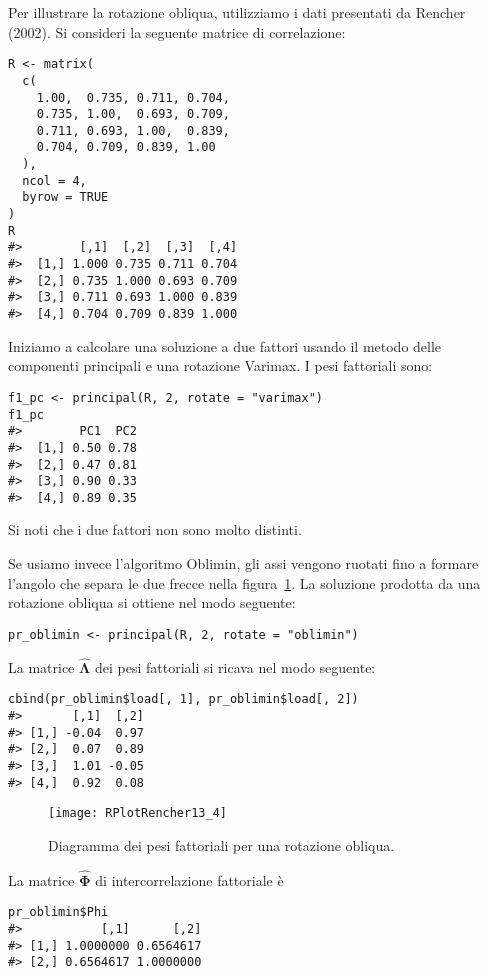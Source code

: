 \bigskip

Per illustrare la rotazione obliqua, utilizziamo i dati presentati da Rencher (2002). Si consideri la seguente matrice di correlazione:
\begin{lstlisting}
R <- matrix(
  c( 
    1.00,  0.735, 0.711, 0.704,
    0.735, 1.00,  0.693, 0.709,
    0.711, 0.693, 1.00,  0.839,
    0.704, 0.709, 0.839, 1.00
  ), 
  ncol = 4, 
  byrow = TRUE
) 
R
#>        [,1]  [,2]  [,3]  [,4]
#>  [1,] 1.000 0.735 0.711 0.704
#>  [2,] 0.735 1.000 0.693 0.709
#>  [3,] 0.711 0.693 1.000 0.839
#>  [4,] 0.704 0.709 0.839 1.000
 \end{lstlisting}
Iniziamo a calcolare una soluzione a due fattori usando il metodo delle componenti principali e una rotazione Varimax. 
I pesi fattoriali sono:
\begin{lstlisting}
f1_pc <- principal(R, 2, rotate = "varimax") 
f1_pc
#>        PC1  PC2 
#>  [1,] 0.50 0.78
#>  [2,] 0.47 0.81
#>  [3,] 0.90 0.33
#>  [4,] 0.89 0.35
\end{lstlisting}
Si noti che i due fattori non sono molto distinti.

Se usiamo invece l'algoritmo Oblimin, gli assi vengono ruotati fino a formare l'angolo che separa le due frecce nella figura~\ref{fig:rencher13_4}. 
La soluzione prodotta da una rotazione obliqua si ottiene nel modo seguente: 
 \medskip
\begin{lstlisting}
pr_oblimin <- principal(R, 2, rotate = "oblimin")     
\end{lstlisting}
La matrice $\hat{\boldsymbol{\Lambda}}$ dei pesi fattoriali si ricava nel modo seguente:
\begin{lstlisting}
cbind(pr_oblimin$load[, 1], pr_oblimin$load[, 2])
#>       [,1]  [,2]
#> [1,] -0.04  0.97
#> [2,]  0.07  0.89
#> [3,]  1.01 -0.05
#> [4,]  0.92  0.08
\end{lstlisting}

 \begin{figure}[h!]
 \centering
   \texttt{[image: RPlotRencher13\_4]}
   \caption{Diagramma dei pesi fattoriali per una rotazione obliqua.}
   \label{fig:rencher13_4}
\end{figure}

\noindent
La matrice $\hat{\boldsymbol{\Phi}}$ di intercorrelazione fattoriale è
\begin{lstlisting}
pr_oblimin$Phi
#>           [,1]      [,2]
#> [1,] 1.0000000 0.6564617
#> [2,] 0.6564617 1.0000000
\end{lstlisting}

